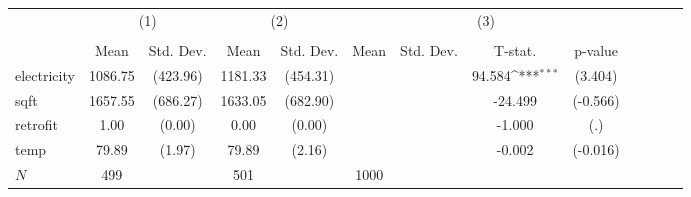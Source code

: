 {
\def\sym#1{\ifmmode^{#1}\else\(^{#1}\)\fi}
\begin{tabular}{l*{3}{cccc}}
\hline\hline
            &\multicolumn{2}{c}{(1)}  &\multicolumn{2}{c}{(2)}  &\multicolumn{4}{c}{(3)}                                     \\
            &\multicolumn{2}{c}{}     &\multicolumn{2}{c}{}     &\multicolumn{4}{c}{}                                        \\
            &        Mean&   Std. Dev.&        Mean&   Std. Dev.&        Mean&   Std. Dev.&     T-stat.         &     p-value\\
\hline
electricity &     1086.75&    (423.96)&     1181.33&    (454.31)&            &            &      94.584\sym{***}&     (3.404)\\
sqft        &     1657.55&    (686.27)&     1633.05&    (682.90)&            &            &     -24.499         &    (-0.566)\\
retrofit    &        1.00&      (0.00)&        0.00&      (0.00)&            &            &      -1.000         &         (.)\\
temp        &       79.89&      (1.97)&       79.89&      (2.16)&            &            &      -0.002         &    (-0.016)\\
\hline
\(N\)       &         499&            &         501&            &        1000&            &                     &            \\
\hline\hline
\end{tabular}
}
